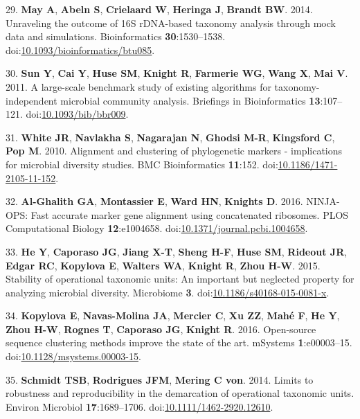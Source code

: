 \documentclass[11pt,]{article}
\begin{document}
\hypertarget{ref-May2014}{}
29. \textbf{May A}, \textbf{Abeln S}, \textbf{Crielaard W},
\textbf{Heringa J}, \textbf{Brandt BW}. 2014. Unraveling the outcome of
16S rDNA-based taxonomy analysis through mock data and simulations.
Bioinformatics \textbf{30}:1530--1538.
doi:\href{https://doi.org/10.1093/bioinformatics/btu085}{10.1093/bioinformatics/btu085}.

\hypertarget{ref-Sun2011}{}
30. \textbf{Sun Y}, \textbf{Cai Y}, \textbf{Huse SM}, \textbf{Knight R},
\textbf{Farmerie WG}, \textbf{Wang X}, \textbf{Mai V}. 2011. A
large-scale benchmark study of existing algorithms for
taxonomy-independent microbial community analysis. Briefings in
Bioinformatics \textbf{13}:107--121.
doi:\href{https://doi.org/10.1093/bib/bbr009}{10.1093/bib/bbr009}.

\hypertarget{ref-White2010}{}
31. \textbf{White JR}, \textbf{Navlakha S}, \textbf{Nagarajan N},
\textbf{Ghodsi M-R}, \textbf{Kingsford C}, \textbf{Pop M}. 2010.
Alignment and clustering of phylogenetic markers - implications for
microbial diversity studies. BMC Bioinformatics \textbf{11}:152.
doi:\href{https://doi.org/10.1186/1471-2105-11-152}{10.1186/1471-2105-11-152}.

\hypertarget{ref-AlGhalith2016}{}
32. \textbf{Al-Ghalith GA}, \textbf{Montassier E}, \textbf{Ward HN},
\textbf{Knights D}. 2016. NINJA-OPS: Fast accurate marker gene alignment
using concatenated ribosomes. PLOS Computational Biology
\textbf{12}:e1004658.
doi:\href{https://doi.org/10.1371/journal.pcbi.1004658}{10.1371/journal.pcbi.1004658}.

\hypertarget{ref-He2015}{}
33. \textbf{He Y}, \textbf{Caporaso JG}, \textbf{Jiang X-T},
\textbf{Sheng H-F}, \textbf{Huse SM}, \textbf{Rideout JR}, \textbf{Edgar
RC}, \textbf{Kopylova E}, \textbf{Walters WA}, \textbf{Knight R},
\textbf{Zhou H-W}. 2015. Stability of operational taxonomic units: An
important but neglected property for analyzing microbial diversity.
Microbiome \textbf{3}.
doi:\href{https://doi.org/10.1186/s40168-015-0081-x}{10.1186/s40168-015-0081-x}.

\hypertarget{ref-Kopylova2016}{}
34. \textbf{Kopylova E}, \textbf{Navas-Molina JA}, \textbf{Mercier C},
\textbf{Xu ZZ}, \textbf{Mahé F}, \textbf{He Y}, \textbf{Zhou H-W},
\textbf{Rognes T}, \textbf{Caporaso JG}, \textbf{Knight R}. 2016.
Open-source sequence clustering methods improve the state of the art.
mSystems \textbf{1}:e00003--15.
doi:\href{https://doi.org/10.1128/msystems.00003-15}{10.1128/msystems.00003-15}.

\hypertarget{ref-Schmidt2014}{}
35. \textbf{Schmidt TSB}, \textbf{Rodrigues JFM}, \textbf{Mering C von}.
2014. Limits to robustness and reproducibility in the demarcation of
operational taxonomic units. Environ Microbiol \textbf{17}:1689--1706.
doi:\href{https://doi.org/10.1111/1462-2920.12610}{10.1111/1462-2920.12610}.
\end{document}
